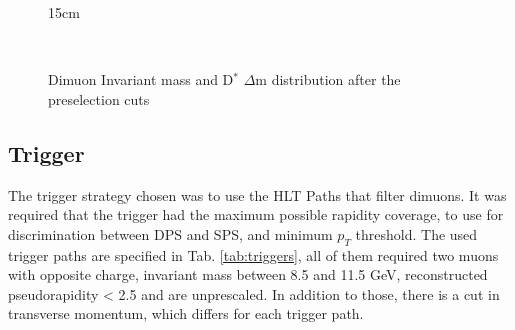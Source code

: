 \begin{figure}[!htm]{15cm}
  \caption{Dimuon Invariant mass and D$^*$ $\Delta$m distribution after the preselection cuts}
  \label{fig:invmass_preselection}
  \hfill
  \\
\end{figure}

\subsection{Trigger}\label{sec:trigger}

The trigger strategy chosen was to use the HLT Paths that filter dimuons. It was required that the trigger had the maximum possible rapidity coverage, to use for discrimination between DPS and SPS, and minimum $p_T$ threshold. The used trigger paths are specified in Tab. \ref{tab:triggers}, all of them required two muons with opposite charge, invariant mass between 8.5 and 11.5 GeV, reconstructed pseudorapidity < 2.5 and are unprescaled. In addition to those, there is a cut in transverse momentum, which differs for each trigger path.

